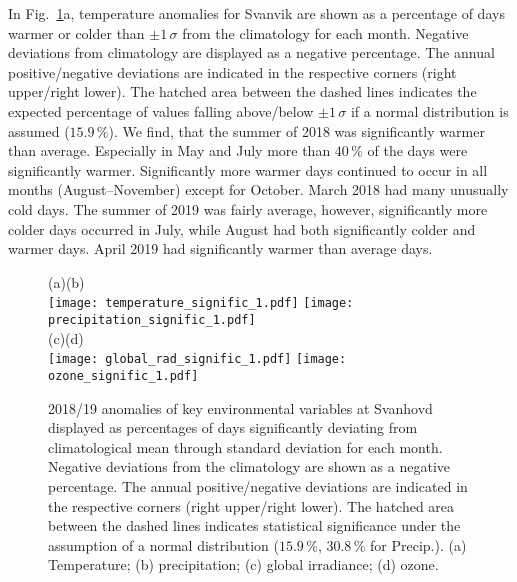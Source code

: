 \documentclass[bg, manuscript]{copernicus}
\begin{document}
In Fig.~\ref{fig:anomalies_svanvik}a, temperature anomalies for Svanvik are shown as a percentage of days warmer or colder than $\pm 1\,\sigma$ from the climatology for each month. Negative deviations from climatology are displayed as a negative percentage. The annual positive/negative deviations are indicated in the respective corners (right upper/right lower). The hatched area between the dashed lines indicates the expected percentage of values falling above/below $\pm 1\,\sigma$ if a normal distribution is assumed ($15.9\,\unit{\%}$). We find, that the summer of 2018 was significantly warmer than average. Especially in May and July more than $40\,\unit{\%}$ of the days were significantly warmer. Significantly more warmer days continued to occur in all months (August--November) except for October. March 2018 had many unusually cold days. The summer of 2019 was fairly average, however, significantly more colder days occurred in July, while August had both significantly colder and warmer days. April 2019 had significantly warmer than average days.

\begin{figure}[t]
  \centering
  (a)\hspace{8.3cm}(b)\\
  \texttt{[image: temperature\_signific\_1.pdf]}
  \texttt{[image: precipitation\_signific\_1.pdf]}\\
  (c)\hspace{8.3cm}(d)\\
  \texttt{[image: global\_rad\_signific\_1.pdf]}
  \texttt{[image: ozone\_signific\_1.pdf]}
  \caption{2018/19 anomalies of key environmental variables at Svanhovd displayed as percentages of days significantly deviating from climatological mean through standard deviation for each month. Negative deviations from the climatology are shown as a negative percentage. The annual positive/negative deviations are indicated in the respective corners (right upper/right lower). The hatched area between the dashed lines indicates statistical significance under the assumption of a normal distribution ($15.9\,\unit{\%}$, $30.8\,\unit{\%}$ for Precip.). (a) Temperature; (b) precipitation; (c) global irradiance; (d) ozone.}
  \label{fig:anomalies_svanvik}
\end{figure}
\end{document}
